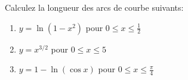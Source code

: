 
\begin{exercice}\label{exoVariete0006}

Calculez la longueur des arcs de courbe suivants:
\begin{enumerate}
	\item
		$y= \ln(1-x^2)$ pour  $0\leq x\leq \frac{1}{2}$
	\item
		$y= x^{3/2}$ pour  $0\leq x\leq 5$
	\item
		$y = 1-\ln(\cos x)$ pour $0\leq x \leq \frac{\pi}{4}$
\end{enumerate}

\end{exercice}
